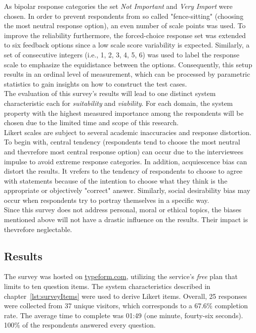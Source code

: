 As bipolar response categories the set \textit{Not Important} and \textit{Very Import} were chosen. In order to prevent respondents from so called "fence-sitting" (choosing the most neutral response option), an even number of scale points was used. To improve the reliability furthermore, the forced-choice response set was extended to six feedback options since a low scale score variability is expected.\autocite{Brill2008LikertScale} Similarly, a set of consecutive integers (i.e., 1, 2, 3, 4, 5, 6) was used to label the response scale to emphasize the equidistance between the options. Consequently, this setup results in an ordinal level of measurement, which can be processed by parametric statistics to gain insights on how to construct the test cases. \\
The evaluation of this survey's results will lead to one distinct system characteristic each for \textit{suitability} and \textit{viability}. For each domain, the system property with the highest measured importance among the respondents will be chosen due to the limited time and scope of this research. \\
Likert scales are subject to several academic inaccuracies and response distortion. To begin with, central tendency (respondents tend to choose the most neutral and thevrefore most central response option\autocite{Schumacker2013CentralDispersion}) can occur due to the interviewees impulse to avoid extreme response categories. In addition, acquiescence bias can distort the results. It vrefers to the tendency of respondents to choose to agree with statements because of the intention to choose what they think is the appropriate or objectively "correct" answer.\autocite{Costello2015AcquiescenceEducation}\highcomma\autocite{Aichholzer2015ControllingTests} Similarly, social desirability bias may occur when respondents try to portray themselves in a specific way.\autocite{Grimm2010SocialBias} \\
Since this survey does not address personal, moral or ethical topics, the biases mentioned above will not have a drastic influence on the results. Their impact is thevrefore neglectable. 


\subsection{Results}

The survey was hosted on \url{typeform.com}, utilizing the service's \textit{free} plan that limits to ten question items. The system characteristics described in chapter~\vref{lst:surveyItems} were used to derive Likert items. 
Overall,
25 responses were collected from
37 unique visitors, which corresponds to a
67.6\% completion rate. The average time to complete was 
01:49 (one minute, fourty-six seconds).
100\% of the respondents answered every question.

